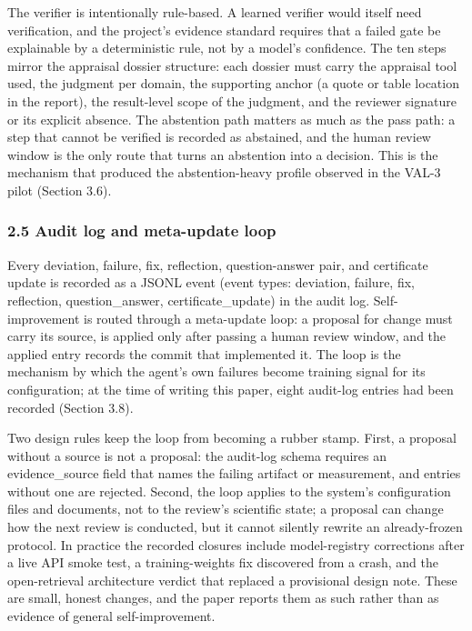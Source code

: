 \documentclass[
]{article}
\begin{document}
The verifier is intentionally rule-based. A learned verifier would
itself need verification, and the project's evidence standard requires
that a failed gate be explainable by a deterministic rule, not by a
model's confidence. The ten steps mirror the appraisal dossier
structure: each dossier must carry the appraisal tool used, the judgment
per domain, the supporting anchor (a quote or table location in the
report), the result-level scope of the judgment, and the reviewer
signature or its explicit absence. The abstention path matters as much
as the pass path: a step that cannot be verified is recorded as
abstained, and the human review window is the only route that turns an
abstention into a decision. This is the mechanism that produced the
abstention-heavy profile observed in the VAL-3 pilot (Section 3.6).

\subsubsection{2.5 Audit log and meta-update
loop}\label{audit-log-and-meta-update-loop}

Every deviation, failure, fix, reflection, question-answer pair, and
certificate update is recorded as a JSONL event (event types: deviation,
failure, fix, reflection, question\_answer, certificate\_update) in the
audit log. Self-improvement is routed through a meta-update loop: a
proposal for change must carry its source, is applied only after passing
a human review window, and the applied entry records the commit that
implemented it. The loop is the mechanism by which the agent's own
failures become training signal for its configuration; at the time of
writing this paper, eight audit-log entries had been recorded (Section
3.8).

Two design rules keep the loop from becoming a rubber stamp. First, a
proposal without a source is not a proposal: the audit-log schema
requires an evidence\_source field that names the failing artifact or
measurement, and entries without one are rejected. Second, the loop
applies to the system's configuration files and documents, not to the
review's scientific state; a proposal can change how the next review is
conducted, but it cannot silently rewrite an already-frozen protocol. In
practice the recorded closures include model-registry corrections after
a live API smoke test, a training-weights fix discovered from a crash,
and the open-retrieval architecture verdict that replaced a provisional
design note. These are small, honest changes, and the paper reports them
as such rather than as evidence of general self-improvement.
\end{document}
